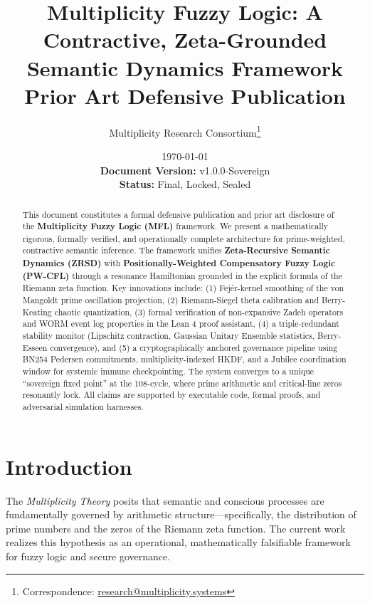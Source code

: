 \documentclass[11pt,a4paper]{article}
\title{\textbf{Multiplicity Fuzzy Logic: A Contractive, Zeta-Grounded Semantic Dynamics Framework}\\[0.3cm]
{\Large Prior Art Defensive Publication}}
\author{Multiplicity Research Consortium\footnote{Correspondence: \href{mailto:research@multiplicity.systems}{research@multiplicity.systems}}}
\date{\today\\[0.2cm]
\textbf{Document Version:} v1.0.0-Sovereign\\
\textbf{Status:} Final, Locked, Sealed}
\theoremstyle{definition}
\theoremstyle{remark}
\begin{document}
\maketitle

\begin{abstract}
This document constitutes a formal defensive publication and prior art disclosure of the \textbf{Multiplicity Fuzzy Logic (MFL)} framework. We present a mathematically rigorous, formally verified, and operationally complete architecture for prime-weighted, contractive semantic inference. The framework unifies \textbf{Zeta-Recursive Semantic Dynamics (ZRSD)} with \textbf{Positionally-Weighted Compensatory Fuzzy Logic (PW-CFL)} through a resonance Hamiltonian grounded in the explicit formula of the Riemann zeta function. Key innovations include: (1) Fejér-kernel smoothing of the von Mangoldt prime oscillation projection, (2) Riemann-Siegel theta calibration and Berry-Keating chaotic quantization, (3) formal verification of non-expansive Zadeh operators and WORM event log properties in the Lean 4 proof assistant, (4) a triple-redundant stability monitor (Lipschitz contraction, Gaussian Unitary Ensemble statistics, Berry-Esseen convergence), and (5) a cryptographically anchored governance pipeline using BN254 Pedersen commitments, multiplicity-indexed HKDF, and a Jubilee coordination window for systemic immune checkpointing. The system converges to a unique ``sovereign fixed point'' at the 108-cycle, where prime arithmetic and critical-line zeros resonantly lock. All claims are supported by executable code, formal proofs, and adversarial simulation harnesses.
\end{abstract}

\tableofcontents
\newpage

\section{Introduction}
\label{sec:intro}

The \textit{Multiplicity Theory} posits that semantic and conscious processes are fundamentally governed by arithmetic structure—specifically, the distribution of prime numbers and the zeros of the Riemann zeta function. The current work realizes this hypothesis as an operational, mathematically falsifiable framework for fuzzy logic and secure governance.
\end{document}

